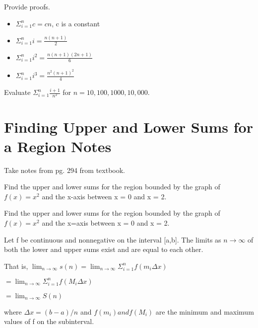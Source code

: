 \documentclass{article}
\theoremstyle{mytheoremstyle}
\theoremstyle{mytheoremstyle}
\theoremstyle{myproblemstyle}
\begin{document}
    \newpage

    \begin{theorem}
        Provide proofs. 
        \begin{itemize}
            \item $ \Sigma_{i=1}^n c = cn$, c is a constant
            \item $ \Sigma_{i=1}^n i = \frac{n(n+1)}{2}$
            \item $ \Sigma_{i=1}^n i^2 = \frac{n(n+1)(2n+1)}{6}$
            \item $ \Sigma_{i=1}^n i^3 = \frac{n^2(n+1)^2}{4}$
        \end{itemize}
    \end{theorem}

    \begin{problem}
        Evaluate $ \Sigma_{i=1}^n \frac{i+1}{n^2} $ for $n = 10, 100, 1000, 10,000$.
    \end{problem}

    \newpage
    


    \section*{Finding Upper and Lower Sums for a Region Notes}
    Take notes from pg. 294 from textbook.
    \newpage
    

    \begin{problem}
        Find the upper and lower sums for the region bounded by the graph of $ f(x) = x^2 $
        and the x-axis between x = 0 and x = 2.

    \end{problem}

    \begin{problem}
        Find the upper and lower sums for the region bounded by the graph of 
        $ f(x) = x^2 $ and the x=axis between x = 0 and x = 2. 
    \end{problem}

    \begin{theorem}
        Let f be continuous and nonnegative on the interval [a,b]. The limits as
        $ n \rightarrow \infty $ of both the lower and upper sums exist and are equal to
        each other.

        That is,
        $ \lim _{n \to \infty } s(n) = \lim _{n \to \infty } \Sigma_{i=1}^n f(m_{i}\Delta x) $
        
        \indent $ = \lim _{n \to \infty } \Sigma_{i=1}^n f(M_{i}\Delta x) $

        \indent $ = \lim _{n \to \infty } S(n) $
        
        where $\Delta x = (b-a)/n$ and $f(m_{i}) and f(M_{i})$ are the minimum and maximum
        values of f on the subinterval.

    \end{theorem}
\end{document}

